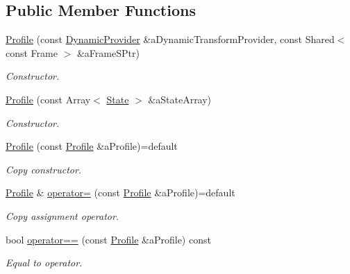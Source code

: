 \subsection*{Public Member Functions}
\begin{DoxyCompactItemize}
\item 
\hyperlink{classlibrary_1_1astro_1_1flight_1_1_profile_a34d66fdddf3eda9a3fed036d6b9a4363}{Profile} (const \hyperlink{namespacelibrary_1_1astro_1_1flight_abb1675a9d237997a3e5c7f343ce8dbc8}{Dynamic\+Provider} \&a\+Dynamic\+Transform\+Provider, const Shared$<$ const Frame $>$ \&a\+Frame\+S\+Ptr)
\begin{DoxyCompactList}\small\item\em Constructor. \end{DoxyCompactList}\item 
\hyperlink{classlibrary_1_1astro_1_1flight_1_1_profile_a554346949f3859757330d058db20f508}{Profile} (const Array$<$ \hyperlink{classlibrary_1_1astro_1_1flight_1_1profile_1_1_state}{State} $>$ \&a\+State\+Array)
\begin{DoxyCompactList}\small\item\em Constructor. \end{DoxyCompactList}\item 
\hyperlink{classlibrary_1_1astro_1_1flight_1_1_profile_af728f8d49bdc8355fb94698e29d87781}{Profile} (const \hyperlink{classlibrary_1_1astro_1_1flight_1_1_profile}{Profile} \&a\+Profile)=default
\begin{DoxyCompactList}\small\item\em Copy constructor. \end{DoxyCompactList}\item 
\hyperlink{classlibrary_1_1astro_1_1flight_1_1_profile}{Profile} \& \hyperlink{classlibrary_1_1astro_1_1flight_1_1_profile_a165425746b98ee39d62052e02954f778}{operator=} (const \hyperlink{classlibrary_1_1astro_1_1flight_1_1_profile}{Profile} \&a\+Profile)=default
\begin{DoxyCompactList}\small\item\em Copy assignment operator. \end{DoxyCompactList}\item 
bool \hyperlink{classlibrary_1_1astro_1_1flight_1_1_profile_a02ca3f2ff4cf5b5cb093b15c4ed8fb33}{operator==} (const \hyperlink{classlibrary_1_1astro_1_1flight_1_1_profile}{Profile} \&a\+Profile) const
\begin{DoxyCompactList}\small\item\em Equal to operator. \end{DoxyCompactList}\item 

\end{DoxyCompactItemize}
